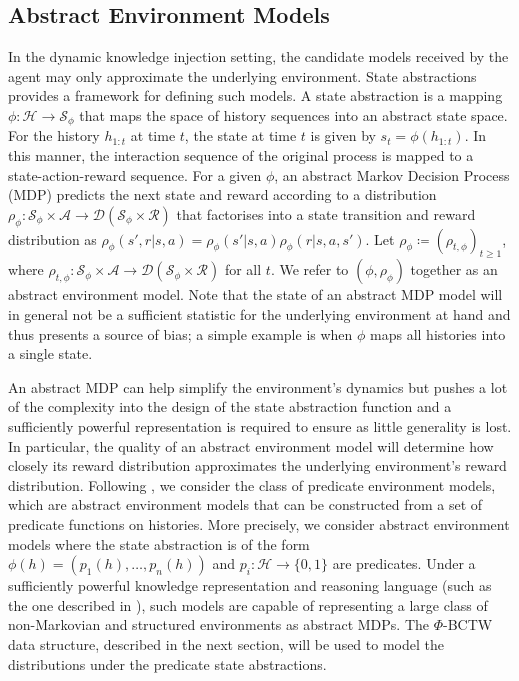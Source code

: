 \documentclass[letterpaper]{article} %
\newcommand {\St}{\mathcal{S}}
\newcommand {\A}{\mathcal{A}}
\newcommand {\Hist}{\mathcal{H}}
\newcommand {\Dist}{\mathcal{D}}
\newcommand {\Reward}{\mathcal{R}}
\theoremstyle{definition}
\begin{document}
\subsection{Abstract Environment Models}
In the dynamic knowledge injection setting, the candidate models received by the agent may only approximate the underlying environment. 
State abstractions provides a framework for defining such models.
A state abstraction is a mapping $\phi: \Hist \to \St_{\phi}$ that maps the space of history sequences into an abstract state space.
For the history $h_{1:t}$ at time $t$, the state at time $t$ is given by $s_t = \phi(h_{1:t})$.
In this manner, the interaction sequence of the original process is mapped to a state-action-reward sequence.
For a given $\phi$, an abstract Markov Decision Process (MDP) predicts the next state and reward according to a distribution $\rho_\phi: \St_{\phi} \times \A \to \Dist(\St_{\phi} \times \Reward)$ that factorises into a state transition and reward distribution as $\rho_\phi(s', r | s, a) = \rho_{\phi}(s' | s, a) \rho_{\phi}(r | s, a, s')$. 
Let $\rho_{\phi} \coloneqq (\rho_{t, \phi})_{t \geq 1}$, where $\rho_{t, \phi}: \St_{\phi} \times \A \to \Dist(\St_{\phi} \times \Reward)$ for all $t$. 
We refer to $(\phi, \rho_{\phi})$ together as an abstract environment model. 
Note that the state of an abstract MDP model will in general not be a sufficient statistic for the underlying environment at hand and thus presents a source of bias; a simple example is when $\phi$ maps all histories into a single state.

An abstract MDP can help simplify the environment's dynamics but pushes a lot of the complexity into the design of the state abstraction function and a sufficiently powerful representation is required to ensure as little generality is lost. 
In particular, the quality of an abstract environment model will determine how closely its reward distribution approximates the underlying environment's reward distribution.
Following \cite{yang-zhao2022a}, we consider the class of predicate environment models, which are abstract environment models that can be constructed from a set of predicate functions on histories.
More precisely, we consider abstract environment models where the state abstraction is of the form $\phi(h) = (p_1(h), \ldots, p_n(h))$ and $p_i: \Hist \to \{0, 1\}$ are predicates. Under a sufficiently powerful knowledge representation and reasoning language (such as the one described in \cite{lloyd11,lloyd03,farmer}), such models are capable of representing a large class of non-Markovian and structured environments as abstract MDPs. 
The $\Phi$-BCTW data structure, described in the next section, will be used to model the distributions under the predicate state abstractions.
\end{document}
